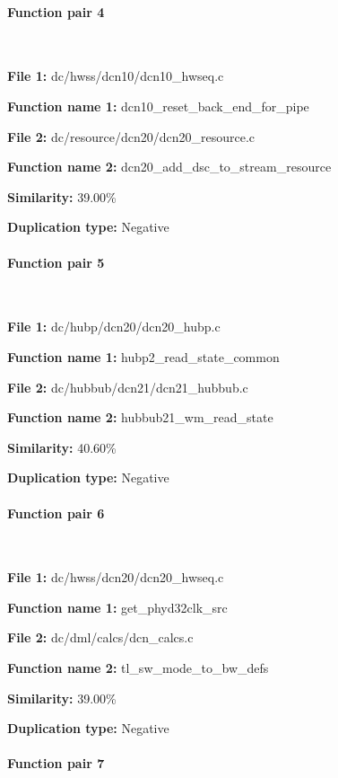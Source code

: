 \paragraph{Function pair 4 }  

\

\textbf{File 1:} dc/hwss/dcn10/dcn10\_hwseq.c

\textbf{Function name 1:} dcn10\_reset\_back\_end\_for\_pipe

\textbf{File 2:} dc/resource/dcn20/dcn20\_resource.c

\textbf{Function name 2:} dcn20\_add\_dsc\_to\_stream\_resource

\textbf{Similarity:} 39.00\%

\textbf{Duplication type:} Negative


\paragraph{Function pair 5 }  

\

\textbf{File 1:} dc/hubp/dcn20/dcn20\_hubp.c

\textbf{Function name 1:} hubp2\_read\_state\_common

\textbf{File 2:} dc/hubbub/dcn21/dcn21\_hubbub.c

\textbf{Function name 2:} hubbub21\_wm\_read\_state

\textbf{Similarity:} 40.60\%

\textbf{Duplication type:} Negative


\paragraph{Function pair 6 }  

\

\textbf{File 1:} dc/hwss/dcn20/dcn20\_hwseq.c

\textbf{Function name 1:} get\_phyd32clk\_src

\textbf{File 2:} dc/dml/calcs/dcn\_calcs.c

\textbf{Function name 2:} tl\_sw\_mode\_to\_bw\_defs

\textbf{Similarity:} 39.00\%

\textbf{Duplication type:} Negative


\paragraph{Function pair 7 }  

